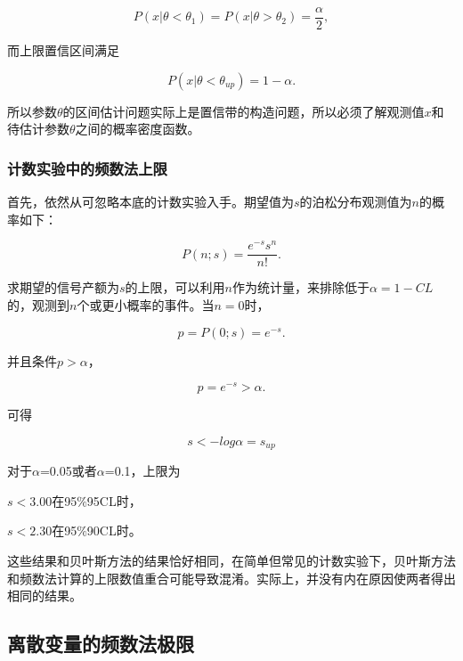 \begin{equation}\label{key}
P(x|\theta<\theta_{1})=P(x|\theta>\theta_{2})=\frac{\alpha}{2},
\end{equation}

而上限置信区间满足

\begin{equation}\label{key}
P(x|\theta<\theta_{up})=1-\alpha.
\end{equation}

所以参数$\theta$的区间估计问题实际上是置信带的构造问题，所以必须了解观测值$x$和待估计参数$\theta$之间的概率密度函数。

\subsubsection{计数实验中的频数法上限}

首先，依然从可忽略本底的计数实验入手。期望值为$s$的泊松分布观测值为$n$的概率如下：

\begin{equation}\label{key}
P(n;s)=\frac{e^{-s}s^{n}}{n!}.
\end{equation}

求期望的信号产额为$s$的上限，可以利用$n$作为统计量，来排除低于$\alpha=1-CL$的，观测到$n$个或更小概率的事件。当$n=0$时，

\begin{equation}\label{key}
p=P(0;s)=e^{-s}.
\end{equation}

并且条件$p>\alpha$，

\begin{equation}\label{key}
p=e^{-s}>\alpha.
\end{equation}

可得

\begin{equation}\label{key}
s<-log\alpha=s_{up}
\end{equation}

对于$\alpha$=0.05或者$\alpha$=0.1，上限为

$s<3.00$在95$\%$95CL时，

$s<2.30$在95$\%$90CL时。

这些结果和贝叶斯方法的结果恰好相同，在简单但常见的计数实验下，贝叶斯方法和频数法计算的上限数值重合可能导致混淆。实际上，并没有内在原因使两者得出相同的结果。

\subsection{离散变量的频数法极限}

